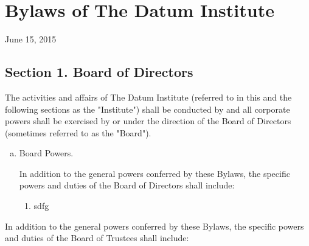 \section{Bylaws of The Datum Institute}

June 15, 2015

\subsection{Section 1. Board of Directors}

The activities and affairs of The Datum Institute (referred to in this and the following sections as the "Institute") shall be conducted by and all corporate powers shall be exercised by or under the direction of the Board of Directors (sometimes referred to as the "Board"). 

\begin{enumerate}[(a)]
\item Board Powers. 

In addition to the general powers conferred by these Bylaws, the specific powers and duties of the Board of Directors shall include:

\begin{enumerate}
\item sdfg
\end{enumerate}

\end{enumerate}

In addition to the general powers conferred by these Bylaws, the specific powers and duties of the Board of Trustees shall include:
